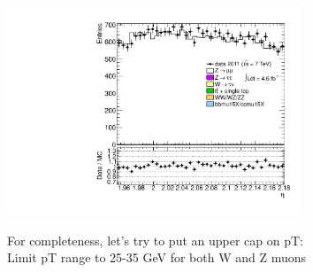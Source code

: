 {\includegraphics[width=0.66\textwidth]{dates/20130306/figures/etaphi/Zpt35_10_A_stack_lN_eta_ALL.pdf} 
\cole
}

 {
For completeness, let's try to put an upper cap on pT: \\
Limit pT range to 25-35 GeV for both W and Z muons
}
